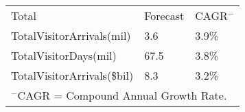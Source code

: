 \begin{tabular}[t]{p{5.1cm}>{\hfill}p{1.1cm}>{\hfill}p{1.3cm}}
 Total & Forecast & CAGR$^-$ \\ 
 TotalVisitorArrivals(mil) & 3.6 & 3.9\% \\ 
  TotalVisitorDays(mil) & 67.5 & 3.8\% \\ 
  TotalVisitorArrivals(\$bil) & 8.3 & 3.2\% \\ 
  
\multicolumn{3}{p{8.25cm}}{$^-$CAGR = Compound Annual Growth Rate.}\\ \end{tabular}
